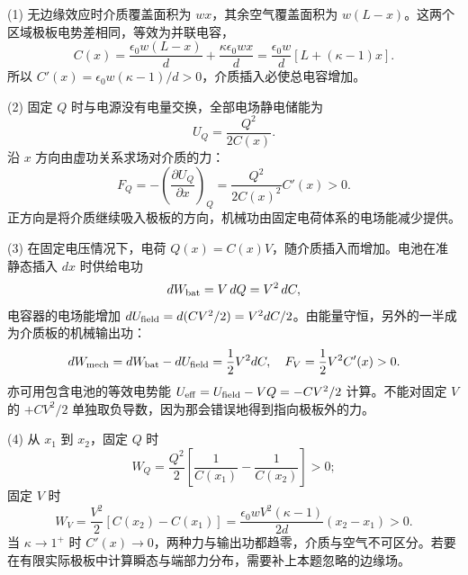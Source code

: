 (1) 无边缘效应时介质覆盖面积为 \(wx\)，其余空气覆盖面积为 \(w(L-x)\)。这两个区域极板电势差相同，等效为并联电容，
\[
C(x)=\frac{\epsilon_0w(L-x)}d+\frac{\kappa\epsilon_0wx}d
=\frac{\epsilon_0w}d[L+(\kappa-1)x].
\]
所以 \(C'(x)=\epsilon_0w(\kappa-1)/d>0\)，介质插入必使总电容增加。

(2) 固定 \(Q\) 时与电源没有电量交换，全部电场静电储能为
\[
U_Q=\frac{Q^2}{2C(x)}.
\]
沿 \(x\) 方向由虚功关系求场对介质的力：
\[
F_Q=-\left(\frac{\partial U_Q}{\partial x}\right)_Q
=\frac{Q^2}{2C(x)^2}C'(x)>0.
\]
正方向是将介质继续吸入极板的方向，机械功由固定电荷体系的电场能减少提供。

(3) 在固定电压情况下，电荷 \(Q(x)=C(x)V\)，随介质插入而增加。电池在准静态插入 \(dx\) 时供给电功
\[
dW_{\rm bat}=V\,dQ=V^2\,dC,
\]
电容器的电场能增加 \(dU_{\rm field}=d(CV^2/2)=V^2dC/2\)。由能量守恒，另外的一半成为介质板的机械输出功：
\[
dW_{\rm mech}=dW_{\rm bat}-dU_{\rm field}
=\frac12V^2dC,
\quad
F_V=\frac12V^2C'(x)>0.
\]
亦可用包含电池的等效电势能 \(U_{\rm eff}=U_{\rm field}-VQ=-CV^2/2\) 计算。不能对固定 \(V\) 的 \(+CV^2/2\) 单独取负导数，因为那会错误地得到指向极板外的力。

(4) 从 \(x_1\) 到 \(x_2\)，固定 \(Q\) 时
\[
W_Q=\frac{Q^2}{2}\left[\frac1{C(x_1)}-\frac1{C(x_2)}\right]>0;
\]
固定 \(V\) 时
\[
W_V=\frac{V^2}{2}[C(x_2)-C(x_1)]
=\frac{\epsilon_0wV^2(\kappa-1)}{2d}(x_2-x_1)>0.
\]
当 \(\kappa\to1^+\) 时 \(C'(x)\to0\)，两种力与输出功都趋零，介质与空气不可区分。若要在有限实际极板中计算瞬态与端部力分布，需要补上本题忽略的边缘场。
